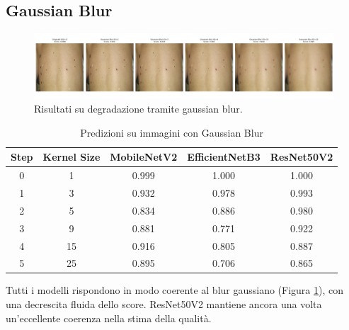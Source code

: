 \subsection{Gaussian Blur}
\begin{figure}[H]
    \centering
    \includegraphics[width=\textwidth]{imgs/gaussianblur.png}
    \caption{Risultati su degradazione tramite gaussian blur.}
    \label{fig:gaussian_blur}
\end{figure}
\begin{table}[H]
\centering
\caption{Predizioni su immagini con Gaussian Blur}
\begin{tabular}{c|c|c|c|c}
\toprule
\textbf{Step} & \textbf{Kernel Size} & \textbf{MobileNetV2} & \textbf{EfficientNetB3} & \textbf{ResNet50V2} \\
\midrule
0 & 1  & 0.999 & 1.000 & 1.000 \\
1 & 3  & 0.932 & 0.978 & 0.993 \\
2 & 5  & 0.834 & 0.886 & 0.980 \\
3 & 9  & 0.881 & 0.771 & 0.922 \\
4 & 15 & 0.916 & 0.805 & 0.887 \\
5 & 25 & 0.895 & 0.706 & 0.865 \\
\bottomrule
\end{tabular}
\end{table}
Tutti i modelli rispondono in modo coerente al blur gaussiano (Figura \ref{fig:gaussian_blur}), con una decrescita fluida dello score. ResNet50V2 mantiene ancora una volta un'eccellente coerenza nella stima della qualità.

